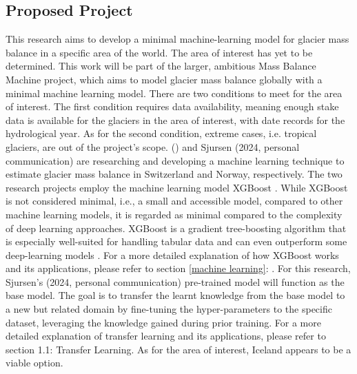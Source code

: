 \subsection{Proposed Project}\label{proposed project}
This research aims to develop a minimal machine-learning model for glacier mass balance in a specific area of the world. The area of interest has yet to be determined. This work will be part of the larger, ambitious Mass Balance Machine project, which aims to model glacier mass balance globally with a minimal machine learning model. There are two conditions to meet for the area of interest. The first condition requires data availability, meaning enough stake data is available for the glaciers in the area of interest, with date records for the hydrological year. As for the second condition, extreme cases, i.e. tropical glaciers, are out of the project's scope.  \citeauthor{van-der-meer-2024} (\citeyear{van-der-meer-2024}) and Sjursen (2024, personal communication) are researching and developing a machine learning technique to estimate glacier mass balance in Switzerland and Norway, respectively. The two research projects employ the machine learning model XGBoost \cite{chen-2016}. While XGBoost is not considered minimal, i.e., a small and accessible model, compared to other machine learning models, it is regarded as minimal compared to the complexity of deep learning approaches. XGBoost is a gradient tree-boosting algorithm that is especially well-suited for handling tabular data and can even outperform some deep-learning models \cite{shwartz-ziv-2022}. For a more detailed explanation of how XGBoost works and its applications, please refer to section \ref{machine learning}: . For this research, Sjursen's (2024, personal communication) pre-trained model will function as the base model. The goal is to transfer the learnt knowledge from the base model to a new but related domain by fine-tuning the hyper-parameters to the specific dataset, leveraging the knowledge gained during prior training. For a more detailed explanation of transfer learning and its applications, please refer to section 1.1: Transfer Learning. As for the area of interest, Iceland appears to be a viable option.

